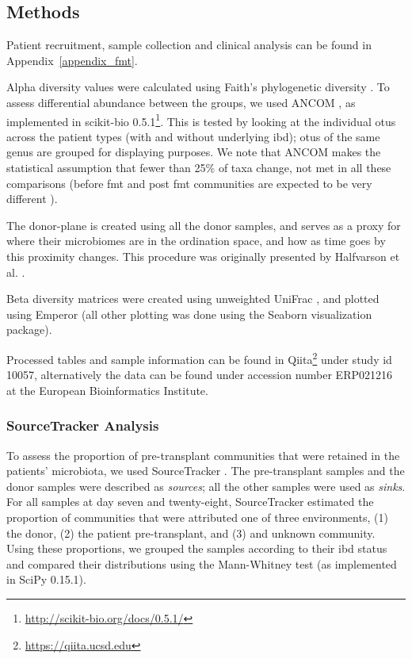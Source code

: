 \subsection{Methods}

Patient recruitment, sample collection and clinical analysis can be found in 
Appendix~\ref{appendix_fmt}.

Alpha diversity values were calculated using Faith's phylogenetic diversity 
\cite{RN4007}. To assess differential abundance between the groups, we used 
ANCOM \cite{RN1513}, as implemented in scikit-bio 
0.5.1\footnote{\url{http://scikit-bio.org/docs/0.5.1/}}. This is tested by 
looking at the individual \glspl{otu} across the patient types (with and 
without underlying \gls{ibd}); \glspl{otu} of the same genus are grouped for 
displaying purposes. We note that ANCOM makes the statistical assumption that 
fewer than 25\% of taxa change, not met in all these comparisons (before 
\gls{fmt} and post \gls{fmt} communities are expected to be very different 
\cite{RN1471}).
 
The donor-plane is created using all the donor samples, and serves as a proxy for where their microbiomes are in the ordination space, and how as time goes by this proximity changes. This procedure was originally presented by Halfvarson et al. \cite{RN1515}.

Beta diversity matrices were created using unweighted UniFrac \cite{RN83}, and plotted using Emperor \cite{RN79} (all other plotting was done using the Seaborn visualization package).

Processed tables and sample information can be found in Qiita\footnote{\url{https://qiita.ucsd.edu}} under study id 10057, alternatively the data can be found under accession number ERP021216 at the European Bioinformatics Institute.

\subsubsection{SourceTracker Analysis}
To assess the proportion of pre-transplant communities that were retained in the patients' microbiota, we used SourceTracker \cite{RN3995}. The pre-transplant samples and the donor samples were described as \textit{sources}; all the other samples were used as \textit{sinks}. For all samples at day seven and twenty-eight, SourceTracker estimated the proportion of communities that were attributed one of three environments, (1) the donor, (2) the patient pre-transplant, and (3) and unknown community. Using these proportions, we grouped the samples according to their \gls{ibd} status and compared their distributions using the Mann-Whitney test (as implemented in SciPy 0.15.1\cite{RN165}).

